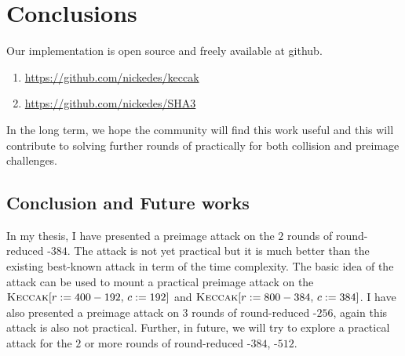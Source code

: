 \chapter{Conclusions}

Our implementation is open source and freely available at github.
\begin{enumerate}
    \item \url{https://github.com/nickedes/keccak}
    \item \url{https://github.com/nickedes/SHA3}
\end{enumerate}

In the long term, we hope the community will find this work useful and this will contribute to solving further rounds of \KECCAK{} practically for both collision and preimage challenges.


\section{Conclusion and Future works}
In my thesis, I have presented a preimage attack on the $2$ rounds of round-reduced \KECCAK-$384$. The attack is not yet practical but it is much better than the existing best-known attack in term of the time complexity. The basic idea of the attack can be used to mount a practical preimage attack on the $\mbox{\textsc{Keccak}}[r:=400-192,\, c:=192]$ and $\mbox{\textsc{Keccak}}[r:=800-384,\,c:=384]$. 
I have also presented a preimage attack on $3$ rounds of round-reduced \KECCAK-$256$, again this attack is also not practical.
Further, in future, we will try to explore a practical attack for the $2$ or more rounds of round-reduced \KECCAK-$384$, \KECCAK-$512$.

